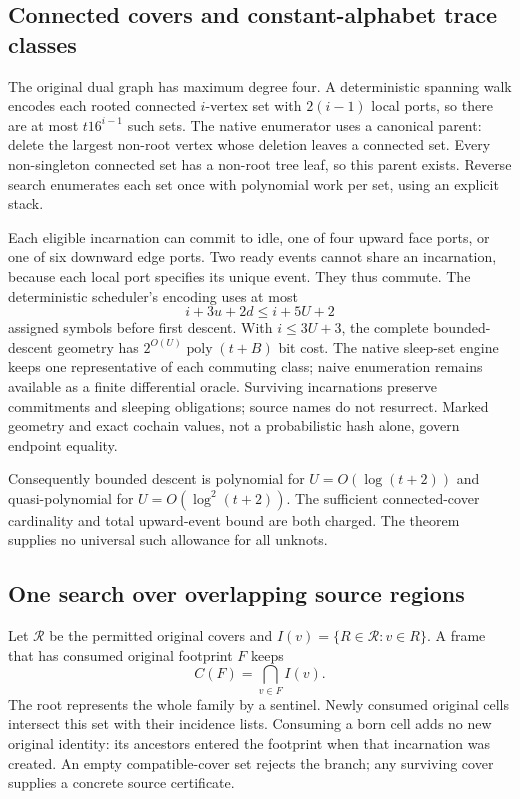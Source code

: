 \subsection{Connected covers and constant-alphabet trace classes}

The original dual graph has maximum degree four. A deterministic spanning
walk encodes each rooted connected $i$-vertex set with $2(i-1)$ local ports,
so there are at most $t16^{i-1}$ such sets. The native enumerator uses a
canonical parent: delete the largest non-root vertex whose deletion leaves
a connected set. Every non-singleton connected set has a non-root tree
leaf, so this parent exists. Reverse search enumerates each set once with
polynomial work per set, using an explicit stack.

Each eligible incarnation can commit to idle, one of four upward face
ports, or one of six downward edge ports. Two ready events cannot share an
incarnation, because each local port specifies its unique event. They thus
commute. The deterministic scheduler's encoding uses at most
\[
                  i+3u+2d\le i+5U+2
\]
assigned symbols before first descent. With $i\le3U+3$, the complete
bounded-descent geometry has $2^{O(U)}\operatorname{poly}(t+B)$ bit cost.
The native sleep-set engine keeps one representative of each commuting
class; naive enumeration remains available as a finite differential oracle.
Surviving incarnations preserve commitments and sleeping obligations; source
names do not resurrect. Marked geometry and exact cochain values, not a
probabilistic hash alone, govern endpoint equality.

Consequently bounded descent is polynomial for $U=O(\log(t+2))$ and
quasi-polynomial for $U=O(\log^2(t+2))$. The sufficient connected-cover
cardinality and total upward-event bound are both charged. The theorem
supplies no universal such allowance for all unknots.

\subsection{One search over overlapping source regions}

Let $\mathcal R$ be the permitted original covers and
$I(v)=\{R\in\mathcal R:v\in R\}$. A frame that has consumed original
footprint $F$ keeps
\[
                  C(F)=\bigcap_{v\in F} I(v).
\]
The root represents the whole family by a sentinel. Newly consumed original
cells intersect this set with their incidence lists. Consuming a born cell
adds no new original identity: its ancestors entered the footprint when
that incarnation was created. An empty compatible-cover set rejects the
branch; any surviving cover supplies a concrete source certificate.

